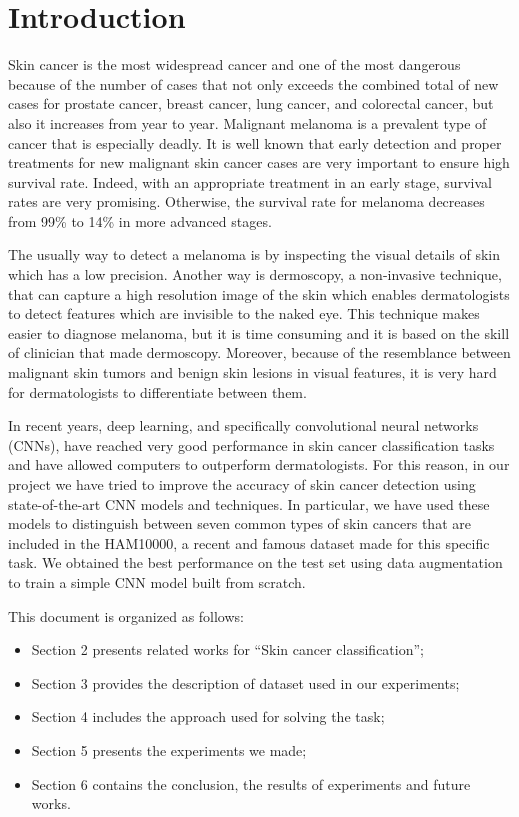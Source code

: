 \section{Introduction}
	Skin cancer is the most widespread cancer and one of the most dangerous because of the number of cases that not only exceeds the combined total of new cases for prostate cancer, breast cancer, lung cancer, and colorectal cancer, but also it increases from year to year. Malignant melanoma is a prevalent type of cancer that is especially deadly. It is well known that early detection and proper treatments for new malignant skin cancer cases are very important to ensure high survival rate. Indeed, with an appropriate treatment in an early stage, survival rates are very promising. Otherwise, the survival rate for melanoma decreases from 99\% to 14\% in more advanced stages.
	
	\smallskip
	
	The usually way to detect a melanoma is by inspecting the visual details of skin which has a low precision. Another way is dermoscopy, a non-invasive technique, that can capture a high resolution image of the skin which enables dermatologists to detect features which are invisible to the naked eye. This technique makes easier to diagnose melanoma, but it is time consuming and it is based on the skill of clinician that made dermoscopy. Moreover, because of the resemblance between malignant skin tumors and benign skin lesions in visual features, it is very hard for dermatologists to differentiate between them.
	
	\smallskip
	
	In recent years, deep learning, and specifically convolutional neural networks (CNNs), have reached very good performance in skin cancer classification tasks and have allowed computers to outperform dermatologists. For this reason, in our project we have tried to improve the accuracy of skin cancer detection using state-of-the-art CNN models and techniques. In particular, we have used these models to distinguish between seven common types of skin cancers that are included in the HAM10000, a recent and famous dataset made for this specific task. We obtained the best performance on the test set using data augmentation to train a simple CNN model built from scratch. 
	
	\bigskip
	
	This document is organized as follows:  
	\begin{itemize}
		\item Section 2 presents related works for ``Skin cancer classification'';
		\item Section 3 provides the description of dataset used in our experiments;
		\item Section 4 includes the approach used for solving the task;
		\item Section 5 presents the experiments we made;
		\item Section 6 contains the conclusion, the results of experiments and future works.
	\end{itemize}
	


	